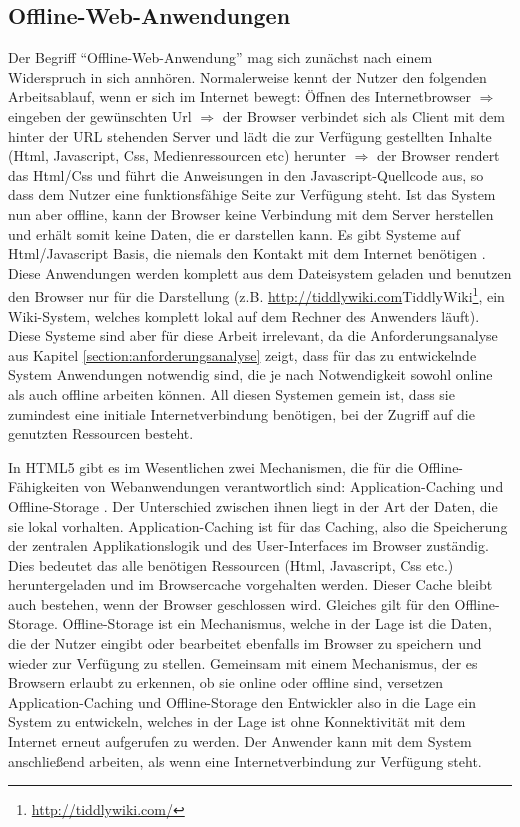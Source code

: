 \subsection{Offline-Web-Anwendungen}
Der Begriff "`Offline-Web-Anwendung"' mag sich zunächst nach einem Widerspruch in sich annhören. Normalerweise kennt der Nutzer den folgenden Arbeitsablauf, wenn er sich im Internet bewegt: Öffnen des Internetbrowser $\Rightarrow$ eingeben der gewünschten Url $\Rightarrow$ der Browser verbindet sich als Client mit dem hinter der URL stehenden Server und lädt die zur Verfügung gestellten Inhalte (Html, Javascript, Css, Medienressourcen etc) herunter $\Rightarrow$ der Browser rendert das Html/Css und führt die Anweisungen in den Javascript-Quellcode aus, so dass dem Nutzer eine funktionsfähige Seite zur Verfügung steht. Ist das System nun aber offline, kann der Browser keine Verbindung mit dem Server herstellen und erhält somit keine Daten, die er darstellen kann. Es gibt Systeme auf Html/Javascript Basis, die niemals den Kontakt mit dem Internet benötigen \cite{html5_rocks_offline_what_does_it_mean}. Diese Anwendungen werden komplett aus dem Dateisystem geladen und benutzen den Browser nur für die Darstellung (z.B. \url{http://tiddlywiki.com}{TiddlyWiki}\footnote{\url{http://tiddlywiki.com/}}, ein Wiki-System, welches komplett lokal auf dem Rechner des Anwenders läuft). Diese Systeme sind aber für diese Arbeit irrelevant, da die Anforderungsanalyse aus Kapitel \ref{section:anforderungsanalyse} zeigt, dass für das zu entwickelnde System Anwendungen notwendig sind, die je nach Notwendigkeit sowohl online als auch offline arbeiten können. All diesen Systemen gemein ist, dass sie zumindest eine initiale Internetverbindung benötigen, bei der Zugriff auf die genutzten Ressourcen besteht. 

In HTML5 gibt es im Wesentlichen zwei Mechanismen, die für die Offline-Fähigkeiten von Webanwendungen verantwortlich sind: Application-Caching und Offline-Storage \cite{html5_rocks_offline_what_does_it_mean}. Der Unterschied zwischen ihnen liegt in der Art der Daten, die sie lokal vorhalten. Application-Caching ist für das Caching, also die Speicherung der zentralen Applikationslogik und des User-Interfaces im Browser zuständig. Dies bedeutet das alle benötigen Ressourcen (Html, Javascript, Css etc.) heruntergeladen und im Browsercache vorgehalten werden. Dieser Cache bleibt auch bestehen, wenn der Browser geschlossen wird. Gleiches gilt für den Offline-Storage. Offline-Storage ist ein Mechanismus, welche in der Lage ist die Daten, die der Nutzer eingibt oder bearbeitet ebenfalls im Browser zu speichern und wieder zur Verfügung zu stellen. Gemeinsam mit einem Mechanismus, der es Browsern erlaubt zu erkennen, ob sie online oder offline sind, versetzen Application-Caching und Offline-Storage den Entwickler also in die Lage ein System zu entwickeln, welches in der Lage ist ohne Konnektivität mit dem Internet erneut aufgerufen zu werden. Der Anwender kann mit dem System anschließend arbeiten, als wenn eine Internetverbindung zur Verfügung steht.

